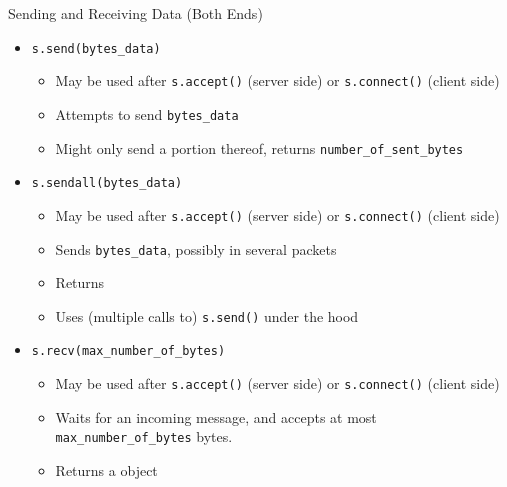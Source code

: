 \begin{frame}{Sending and Receiving Data (Both Ends)}
%
\begin{itemize}
\item \texttt{s.send(bytes\_data)}
	\begin{itemize}
	\item May be used after \texttt{s.accept()} (server side) or \texttt{s.connect()} (client side)
	\item Attempts to send \texttt{bytes\_data}
	\item Might only send a portion thereof, returns \texttt{number\_of\_sent\_bytes}
	\end{itemize}
\pause
\item \texttt{s.sendall(bytes\_data)}
	\begin{itemize}
	\item May be used after \texttt{s.accept()} (server side) or \texttt{s.connect()} (client side)
	\item Sends \texttt{bytes\_data}, possibly in several packets
	\item Returns 
	\item Uses (multiple calls to) \texttt{s.send()} under the hood
	\end{itemize}
\pause
\item \texttt{s.recv(max\_number\_of\_bytes)}
	\begin{itemize}
	\item May be used after \texttt{s.accept()} (server side) or \texttt{s.connect()} (client side)
	\item Waits for an incoming message, and accepts at most \texttt{max\_number\_of\_bytes} bytes.
	\item Returns a  object
	\end{itemize}
\end{itemize}
%
\end{frame}


